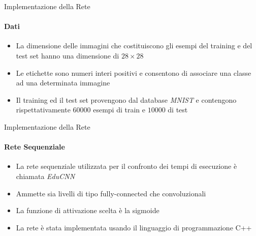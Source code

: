 \documentclass[
 ]{beamer}
\begin{document}
\begin{frame}{Implementazione della Rete}
    \framesubtitle{Dati}
    \begin{itemize} [<+->]
        \setlength\itemsep{3em}
        \item \large La dimensione delle immagini che costituiscono gli esempi del training e del test set hanno una dimensione di $28 \times 28$
        \item \large Le etichette sono numeri interi positivi e consentono di associare una classe ad una determinata immagine 
        \item \large Il training ed il test set provengono dal database \emph{MNIST} e contengono rispettativamente $60000$ esempi di train e $10000$ di test 
    \end{itemize}
\end{frame}

\begin{frame}{Implementazione della Rete}
    \framesubtitle{Rete Sequenziale}
    \begin{itemize} [<+->]
        \setlength\itemsep{3em}
        \item \large La rete sequenziale utilizzata per il confronto dei tempi di esecuzione è chiamata \emph{EduCNN}
        \item \large Ammette sia livelli di tipo fully-connected che convoluzionali
        \item \large La funzione di attivazione scelta è la sigmoide
        \item \large La rete è stata implementata usando il linguaggio di programmazione C++  
    \end{itemize}
\end{frame}
\end{document}
